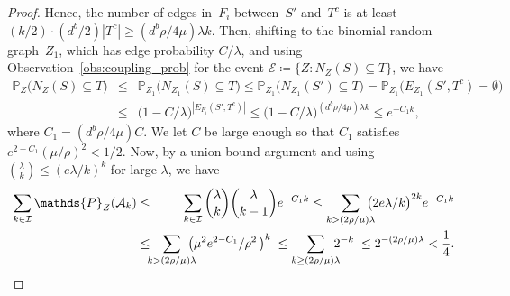 \documentclass[10pt,a4paper]{amsart}
\begin{document}
\begin{proof}
    Hence, the number of edges in~$F_i$ between~$S'$ and~$T^c$ is at least $(k/2)\cdot(d^b/{2})|T^c| \geq (d^b\rho/4\mu) \lambda k$. Then, shifting to the binomial random graph~$Z_1$, which has edge probability $C/\lambda$, and using Observation~\ref{obs:coupling_prob} for the event $\mathcal{E} \coloneqq \{Z: N_Z(S) \subseteq T\}$, we have 
    \begin{eqnarray*}
        \mathds{P}_Z\bigl(N_Z(S) \subseteq T\bigr) &\leq& \mathds{P}_{Z_1}\!\bigl(N_{Z_1}\!(S) \subseteq T\bigr) \leq \mathds{P}_{Z_1}\!\bigl(N_{Z_1}\!(S') \subseteq T\bigr) = \mathds{P}_{Z_1}\!\bigl(E_{Z_1}\!(S', T^c) = \emptyset \bigr)\\
        &\leq& \bigl(1 - C/\lambda\bigr)^{|E_{F_i}(S', T^c)|} \leq \bigl(1 - C/\lambda\bigr)^{(d^b \rho/{4 \mu}) \lambda k} \leq e^{-C_{1}k},
    \end{eqnarray*}
    where $C_1 = (d^b \rho/4 \mu)C$. We let $C$ be large enough so that $C_1$ satisfies $e^{2-C_1}(\mu/ \rho)^2 < 1/2$. Now, by a union-bound argument and using $\binom{\lambda}{k} \leq (e\lambda/k)^k$ for large $\lambda$, we have    
    \begin{eqnarray*}
        \sum_{k \in \mathcal{I}} \mathds{P}_Z(\mathcal{A}_k) &\leq& \sum_{k \in \mathcal{I}} \binom{\lambda}{k}\binom{\lambda}{k-1} e^{-C_1k} \leq \smashoperator[r]{\sum_{k > (2\rho/\mu)\lambda}}\;\; \bigl({2e\lambda}/{k}\bigr)^{2k} e^{-C_1k}\\
        &\leq& \smashoperator{\sum_{k > (2\rho/\mu)\lambda}}\;\; \bigl(\mu^2 e^{2-C_1}/\rho^2\,\bigr)^{k} \;\leq \smashoperator[r]{\sum_{k \geq (2\rho/\mu)\lambda}}\;\; 2^{-k} \;\leq 2^{-(2\rho/\mu)\lambda} < \frac{1}{4}.
    \end{eqnarray*}
    

\end{proof}
\end{document}
